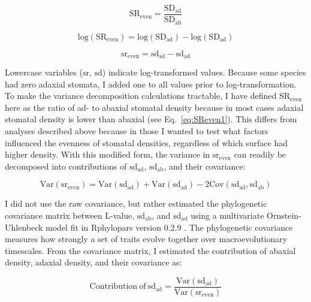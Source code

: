 \documentclass[12pt, oneside]{article}
\newcommand{\pkg}[1]{{\fontseries{b}\selectfont #1}}
\newcommand{\el}{L-value}
\begin{document}
\begin{equation} \label{eq:SReven2} 
  \mathrm{SR_{even}} = \frac{\mathrm{SD_{ad}}}{\mathrm{SD_{ab}}}
\end{equation}

\begin{equation} \label{eq:logSReven} 
  \mathrm{log(SR_{even})} = \mathrm{log(SD_{ad})} - \mathrm{log(SD_{ad})}
\end{equation}

\begin{equation} \label{eq:SReven3} 
  \mathrm{sr_{even}} = \mathrm{sd_{ad}} - \mathrm{sd_{ad}}
\end{equation}

Lowercase variables ($\mathrm{sr}$, $\mathrm{sd}$) indicate log-transformed values. Because some species had zero adaxial stomata, I added one to all values prior to log-transformation. To make the variance decomposition calculations tractable, I have defined $\mathrm{SR_{even}}$ here as the ratio of ad- to abaxial stomatal density because in most cases adaxial stomatal density is lower than abaxial (see Eq.~\ref{eq:SReven1}). This differs from analyses described above because in those I wanted to test what factors influenced the evenness of stomatal densities, regardless of which surface had higher density. With this modified form, the variance in $\mathrm{sr_{even}}$ can readily be decomposed into contributions of $\mathrm{sd_{ad}}$, $\mathrm{sd_{ab}}$, and their covariance:

\begin{equation} \label{eq:varDecomp}
	\mathrm{Var(sr_{even})} = \mathrm{Var(sd_{ad})} + \mathrm{Var(sd_{ad})} - 2 \mathrm{Cov(sd_{ad}, sd_{ab})}
\end{equation}

I did not use the raw covariance, but rather estimated the phylogenetic covariance matrix between \el, $\mathrm{sd_{ab}}$, and $\mathrm{sd_{ad}}$ using a multivariate Ornstein-Uhlenbeck model fit in \pkg{Rphylopars} version 0.2.9 \citep{Goolsby_etal_2016, Goolsby_etal_2017}. The phylogenetic covariance measures how strongly a set of traits evolve together over macroevolutionary timescales. From the covariance matrix, I estimated the contribution of abaxial density, adaxial density, and their covariance as:

\begin{equation} \label{eq:contribution_ad}
	\mathrm{Contribution~of~sd_{ad}} = \frac{\mathrm{Var(sd_{ad})}}{\mathrm{Var(sr_{even})}}
\end{equation}
\end{document}
